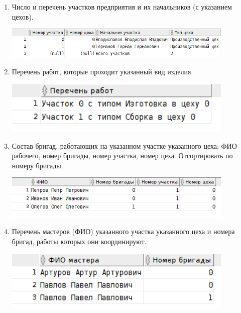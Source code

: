 \begin{enumerate}
    \item Число и перечень участков предприятия и их начальников (с указанием цехов).

    

    \includegraphics[width=11cm]{./screenshots/results/result4.png}

    \item Перечень работ, которые проходит указанный вид изделия.

    

    \includegraphics[width=11cm]{./screenshots/results/result5.png}

    \item Состав бригад, работающих на указанном участке указанного цеха: ФИО рабочего, номер бригады, номер участка, номер цеха. Отсортировать по номеру бригады.

    

    \includegraphics[width=11cm]{./screenshots/results/result6.png}

    \item Перечень мастеров (ФИО) указанного участка указанного цеха и номера бригад, работы которых они координируют.

    

    \includegraphics[width=11cm]{./screenshots/results/result7.png}


\end{enumerate}
